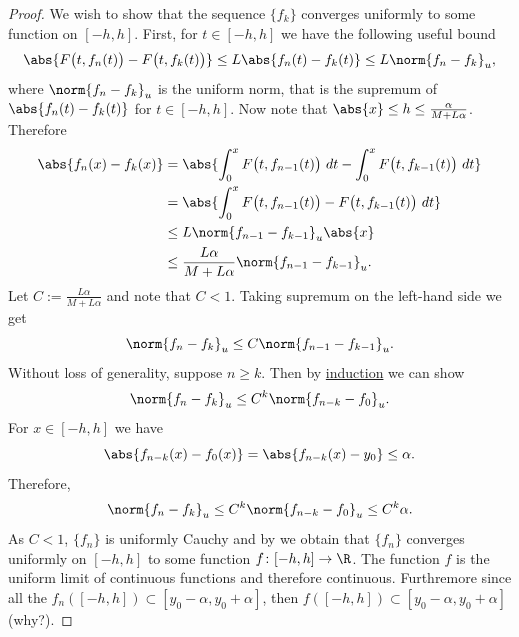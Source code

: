 \documentclass[12pt]{book}
\begin{document}
\begin{proof}
We wish to show that the sequence $\{ f_k \}$ converges uniformly
to some function on $[-h,h]$.
First, for $t \in [-h,h]$
we have the following
useful bound
\begin{equation*}
\abs{F\bigl(t,f_{n}(t)\bigr) - 
F\bigl(t,f_{k}(t)\bigr)}
\leq
L \abs{f_n(t)-f_k(t)}
\leq
L \norm{f_n-f_k}_u ,
\end{equation*}
where $\norm{f_n-f_k}_u$ is the uniform norm, that
is the supremum of $\abs{f_n(t)-f_k(t)}$ for $t \in [-h,h]$.
Now note that $\abs{x} \leq h \leq \frac{\alpha}{M+L\alpha}$.
Therefore
\begin{equation*}
\begin{split}
\abs{f_n(x) - f_k(x)}
& =
\abs{\int_{0}^x F\bigl(t,f_{n-1}(t)\bigr)~dt 
-
\int_{0}^x F\bigl(t,f_{k-1}(t)\bigr)~dt}
\\
& =
\abs{\int_{0}^x F\bigl(t,f_{n-1}(t)\bigr)-
F\bigl(t,f_{k-1}(t)\bigr)~dt}
\\
& \leq
L\norm{f_{n-1}-f_{k-1}}_u
\abs{x}
\\
& \leq
\frac{L\alpha}{M+L\alpha}
\norm{f_{n-1}-f_{k-1}}_u .
\end{split}
\end{equation*}
Let $C := \frac{L\alpha}{M+L\alpha}$ and note that $C < 1$.
Taking supremum on the left-hand side we get
\begin{equation*}
\norm{f_n-f_k}_u \leq C \norm{f_{n-1}-f_{k-1}}_u .
\end{equation*}
Without loss of generality,
suppose $n \geq k$.
Then by \hyperref[induction:thm]{induction} we can show 
\begin{equation*}
\norm{f_n-f_k}_u \leq C^{k} \norm{f_{n-k}-f_{0}}_u .
\end{equation*}
For $x \in [-h,h]$ we have
\begin{equation*}
\abs{f_{n-k}(x)-f_{0}(x)}
=
\abs{f_{n-k}(x)-y_0}
\leq \alpha .
\end{equation*}
Therefore,
\begin{equation*}
\norm{f_n-f_k}_u \leq C^{k} \norm{f_{n-k}-f_{0}}_u \leq C^{k} \alpha .
\end{equation*}
As $C < 1$, $\{f_n\}$ is uniformly Cauchy and by
 we obtain that $\{ f_n \}$
converges uniformly on $[-h,h]$ to some function $f \colon [-h,h] \to \R$.
The function $f$ is the uniform limit of continuous functions and therefore
continuous.
Furthremore since all the $f_n([-h,h]) \subset
[y_0-\alpha,y_0+\alpha]$, then $f([-h,h]) \subset [y_0-\alpha,y_0+\alpha]$
(why?).



\end{proof}
\end{document}
